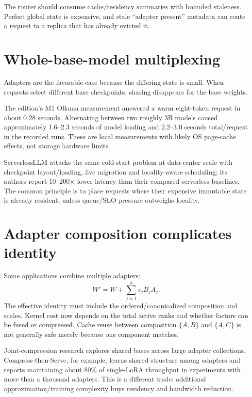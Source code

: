 The router should consume cache/residency summaries with bounded staleness. Perfect
global state is expensive, and stale ``adapter present'' metadata can route a request
to a replica that has already evicted it.

\section{Whole-base-model multiplexing}

Adapters are the favorable case because the differing state is small. When requests
select different base checkpoints, sharing disappears for the base weights.

The edition's M1 Ollama measurement answered a warm eight-token request in about
0.28 seconds. Alternating between two roughly 3B models caused approximately
1.6--2.3 seconds of model loading and 2.2--3.0 seconds total/request in the recorded
runs. These are local measurements with likely OS page-cache effects, not storage
hardware limits.

ServerlessLLM attacks the same cold-start problem at data-center scale with checkpoint
layout/loading, live migration and locality-aware scheduling; its authors report
10--200$\times$ lower latency than their compared serverless baselines. \cite{fu2024serverlessllm}
The common principle is to place requests where their expensive immutable state is
already resident, unless queue/SLO pressure outweighs locality.

\section{Adapter composition complicates identity}

Some applications combine multiple adapters:
\[
W'=W+\sum_{j=1}^{k}s_jB_jA_j.
\]
The effective identity must include the ordered/canonicalized composition and scales.
Kernel cost now depends on the total active ranks and whether factors can be fused or
compressed. Cache reuse between composition $\{A,B\}$ and $\{A,C\}$ is not generally
safe merely because one component matches.

Joint-compression research explores shared bases across large adapter collections.
Compress-then-Serve, for example, learns shared structure among adapters and reports
maintaining about 80\% of single-LoRA throughput in experiments with more than a
thousand adapters. \cite{bruelgabrielsson2024compress}
This is a different trade: additional approximation/training complexity buys residency
and bandwidth reduction.


